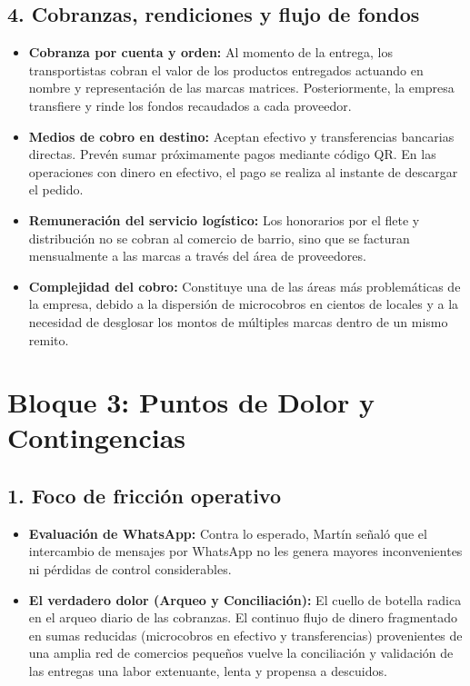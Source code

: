 \documentclass[11pt,a4paper]{article}
\begin{document}
\subsection*{4. Cobranzas, rendiciones y flujo de fondos}
\begin{itemize}
  \item \textbf{Cobranza por cuenta y orden:} Al momento de la entrega, los transportistas cobran el valor de los productos entregados actuando en nombre y representación de las marcas matrices. Posteriormente, la empresa transfiere y rinde los fondos recaudados a cada proveedor.
  \item \textbf{Medios de cobro en destino:} Aceptan efectivo y transferencias bancarias directas. Prevén sumar próximamente pagos mediante código QR. En las operaciones con dinero en efectivo, el pago se realiza al instante de descargar el pedido.
  \item \textbf{Remuneración del servicio logístico:} Los honorarios por el flete y distribución no se cobran al comercio de barrio, sino que se facturan mensualmente a las marcas a través del área de proveedores.
  \item \textbf{Complejidad del cobro:} Constituye una de las áreas más problemáticas de la empresa, debido a la dispersión de microcobros en cientos de locales y a la necesidad de desglosar los montos de múltiples marcas dentro de un mismo remito.
\end{itemize}

\section*{Bloque 3: Puntos de Dolor y Contingencias}

\subsection*{1. Foco de fricción operativo}
\begin{itemize}
  \item \textbf{Evaluación de WhatsApp:} Contra lo esperado, Martín señaló que el intercambio de mensajes por WhatsApp no les genera mayores inconvenientes ni pérdidas de control considerables.
  \item \textbf{El verdadero dolor (Arqueo y Conciliación):} El cuello de botella radica en el arqueo diario de las cobranzas. El continuo flujo de dinero fragmentado en sumas reducidas (microcobros en efectivo y transferencias) provenientes de una amplia red de comercios pequeños vuelve la conciliación y validación de las entregas una labor extenuante, lenta y propensa a descuidos.
\end{itemize}
\end{document}
